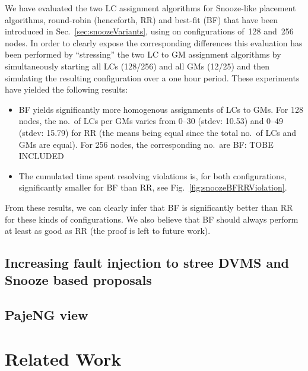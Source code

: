 We have evaluated the two LC assignment algorithms for Snooze-like
placement algorithms, round-robin (henceforth, RR) and best-fit (BF)
that have been introduced in Sec.~\ref{sec:snoozeVariants}, using
\vmps on configurations of~128 and~256 nodes. In order to clearly
expose the corresponding differences this evaluation has been
performed by ``stressing'' the two LC to GM assignment algorithms by
simultaneously starting all LCs (128/256) and all GMs (12/25) and then
simulating the resulting configuration over a one hour period.  These
experiments have yielded the following results:
\begin{itemize}
  \item BF yields significantly more homogenous assignments of LCs to
    GMs. For 128 nodes, the no.\ of LCs per GMs varies from 0--30
    (stdev: 10.53) and 0--49 (stdev: 15.79) for RR (the means being
    equal since the total no.\ of LCs and GMs are equal). For 256
    nodes, the corresponding no.\ are BF: TOBE INCLUDED
  \item The cumulated time spent resolving violations is, for both
    configurations, significantly smaller for BF than RR, see
    Fig.~\ref{fig:snoozeBFRRViolation}.
\end{itemize}
From these results, we can clearly infer that BF is significantly
better than RR for these kinds of configurations. We also 
believe that BF should always perform at least as good as RR (the
proof is left to future work).

\subsection{Increasing fault injection to stree DVMS and Snooze based proposals}
\MS[JP]{}
\subsection{PajeNG view}
\section{Related Work}
\label{sec:related}

